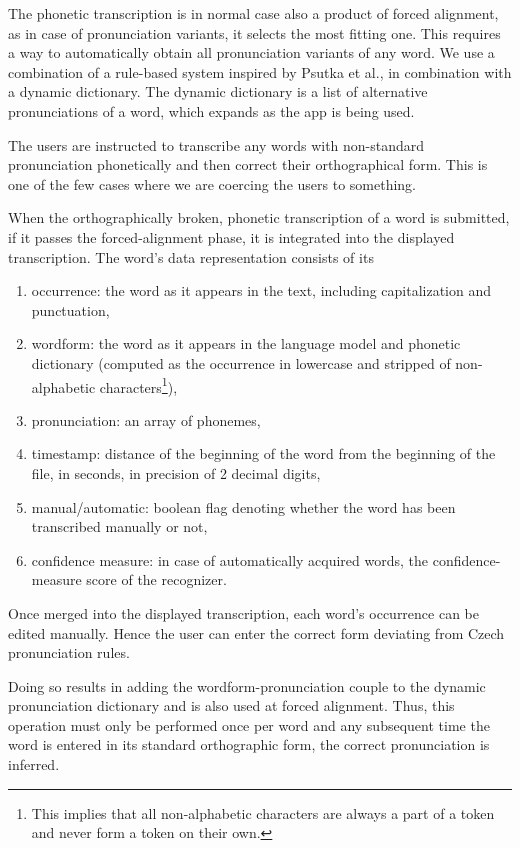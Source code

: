 \documentclass{itatnew}
\begin{document}
The phonetic transcription is in normal case also a product of forced alignment,
as in case of pronunciation variants, it selects the most fitting one. This
requires a way to automatically obtain all pronunciation variants of any word.
We use a combination of a rule-based system inspired by Psutka et
al.\cite{psutka2004development}, in combination with a dynamic dictionary.
The dynamic dictionary is a list of alternative pronunciations of a word, which
expands as the app is being used.

The users are instructed to transcribe any words with non-standard pronunciation
phonetically and then correct their orthographical form. This is one of the few
cases where we are coercing the users to something.

When the orthographically broken, phonetic transcription of a word is submitted,
if it passes the forced-alignment phase, it is integrated into the displayed
transcription. The word's data representation consists of its
\begin{enumerate}
\item{occurrence:
    the word as it appears in the text, including capitalization and
    punctuation,
}
\item{wordform:
    the word as it appears in the language model and phonetic dictionary
    (computed as the occurrence in lowercase and stripped of non-alphabetic
    characters\footnote{This implies that all non-alphabetic characters are
    always a part of a token and never form a token on their own.}),
}
\item{pronunciation:
    an array of phonemes,
}
\item{timestamp:
    distance of the beginning of the word from the beginning of the file, in
    seconds, in precision of 2 decimal digits,
}
\item{manual/automatic:
    boolean flag denoting whether the word has been transcribed manually or not,
}
\item{confidence measure:
    in case of automatically acquired words, the confidence-measure score of the
    recognizer.
}
\end{enumerate}
Once merged into the displayed transcription, each word's occurrence can be
edited manually. Hence the user can enter the correct form deviating from Czech
pronunciation rules.

Doing so results in adding the wordform-pronunciation couple to the dynamic
pronunciation dictionary and is also used at forced alignment. Thus, this
operation must only be performed once per word and any subsequent time the word
is entered in its standard orthographic form, the correct pronunciation is
inferred.
\end{document}
